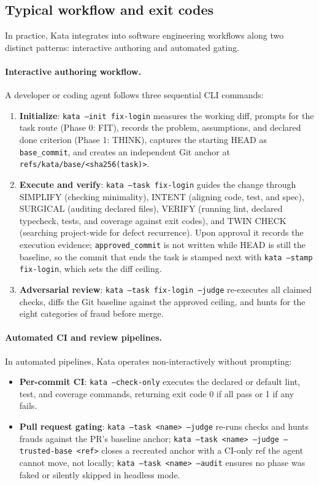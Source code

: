 \documentclass{sbc2019}%
\begin{document}
\subsection{Typical workflow and exit codes}

In practice, Kata integrates into software engineering workflows along two
distinct patterns: interactive authoring and automated gating.

\paragraph{Interactive authoring workflow.} A developer or coding agent
follows three sequential CLI commands:
\begin{enumerate}
\item \textbf{Initialize}: \texttt{kata --init fix-login} measures the working diff,
prompts for the task route (Phase 0: FIT), records the problem, assumptions,
and declared done criterion (Phase 1: THINK), captures the starting HEAD as
\texttt{base\_commit}, and creates an independent Git anchor at
\texttt{refs/kata/base/<sha256(task)>}.
\item \textbf{Execute and verify}: \texttt{kata --task fix-login} guides the
change through SIMPLIFY (checking minimality), INTENT (aligning code, test,
and spec), SURGICAL (auditing declared files), VERIFY (running lint, declared
typecheck, tests, and coverage against exit codes), and TWIN CHECK (searching
project-wide for defect recurrence). Upon approval it records the execution
evidence; \texttt{approved\_commit} is not written while HEAD is still the
baseline, so the commit that ends the task is stamped next with
\texttt{kata --stamp fix-login}, which sets the diff ceiling.
\item \textbf{Adversarial review}: \texttt{kata --task fix-login --judge}
re-executes all claimed checks, diffs the Git baseline against the approved
ceiling, and hunts for the eight categories of fraud before merge.
\end{enumerate}

\paragraph{Automated CI and review pipelines.} In automated pipelines,
Kata operates non-interactively without prompting:
\begin{itemize}
\item \textbf{Per-commit CI}: \texttt{kata --check-only} executes the declared
or default lint, test, and coverage commands, returning exit code 0 if all
pass or 1 if any fails.
\item \textbf{Pull request gating}: \texttt{kata --task <name> --judge}
re-runs checks and hunts frauds against the PR's baseline anchor;
\texttt{kata --task <name> --judge --trusted-base <ref>} closes a recreated
anchor with a CI-only ref the agent cannot move, not locally;
\texttt{kata --task <name> --audit} ensures no phase was faked or silently
skipped in headless mode.
\end{itemize}
\end{document}
